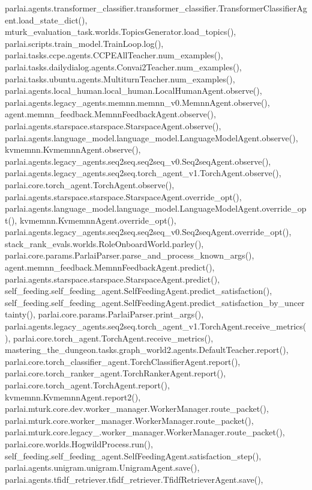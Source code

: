 parlai.\+agents.\+transformer\+\_\+classifier.\+transformer\+\_\+classifier.\+Transformer\+Classifier\+Agent.\+load\+\_\+state\+\_\+dict(), mturk\+\_\+evaluation\+\_\+task.\+worlds.\+Topics\+Generator.\+load\+\_\+topics(), parlai.\+scripts.\+train\+\_\+model.\+Train\+Loop.\+log(), parlai.\+tasks.\+ccpe.\+agents.\+C\+C\+P\+E\+All\+Teacher.\+num\+\_\+examples(), parlai.\+tasks.\+dailydialog.\+agents.\+Convai2\+Teacher.\+num\+\_\+examples(), parlai.\+tasks.\+ubuntu.\+agents.\+Multiturn\+Teacher.\+num\+\_\+examples(), parlai.\+agents.\+local\+\_\+human.\+local\+\_\+human.\+Local\+Human\+Agent.\+observe(), parlai.\+agents.\+legacy\+\_\+agents.\+memnn.\+memnn\+\_\+v0.\+Memnn\+Agent.\+observe(), agent.\+memnn\+\_\+feedback.\+Memnn\+Feedback\+Agent.\+observe(), parlai.\+agents.\+starspace.\+starspace.\+Starspace\+Agent.\+observe(), parlai.\+agents.\+language\+\_\+model.\+language\+\_\+model.\+Language\+Model\+Agent.\+observe(), kvmemnn.\+Kvmemnn\+Agent.\+observe(), parlai.\+agents.\+legacy\+\_\+agents.\+seq2seq.\+seq2seq\+\_\+v0.\+Seq2seq\+Agent.\+observe(), parlai.\+agents.\+legacy\+\_\+agents.\+seq2seq.\+torch\+\_\+agent\+\_\+v1.\+Torch\+Agent.\+observe(), parlai.\+core.\+torch\+\_\+agent.\+Torch\+Agent.\+observe(), parlai.\+agents.\+starspace.\+starspace.\+Starspace\+Agent.\+override\+\_\+opt(), parlai.\+agents.\+language\+\_\+model.\+language\+\_\+model.\+Language\+Model\+Agent.\+override\+\_\+opt(), kvmemnn.\+Kvmemnn\+Agent.\+override\+\_\+opt(), parlai.\+agents.\+legacy\+\_\+agents.\+seq2seq.\+seq2seq\+\_\+v0.\+Seq2seq\+Agent.\+override\+\_\+opt(), stack\+\_\+rank\+\_\+evals.\+worlds.\+Role\+Onboard\+World.\+parley(), parlai.\+core.\+params.\+Parlai\+Parser.\+parse\+\_\+and\+\_\+process\+\_\+known\+\_\+args(), agent.\+memnn\+\_\+feedback.\+Memnn\+Feedback\+Agent.\+predict(), parlai.\+agents.\+starspace.\+starspace.\+Starspace\+Agent.\+predict(), self\+\_\+feeding.\+self\+\_\+feeding\+\_\+agent.\+Self\+Feeding\+Agent.\+predict\+\_\+satisfaction(), self\+\_\+feeding.\+self\+\_\+feeding\+\_\+agent.\+Self\+Feeding\+Agent.\+predict\+\_\+satisfaction\+\_\+by\+\_\+uncertainty(), parlai.\+core.\+params.\+Parlai\+Parser.\+print\+\_\+args(), parlai.\+agents.\+legacy\+\_\+agents.\+seq2seq.\+torch\+\_\+agent\+\_\+v1.\+Torch\+Agent.\+receive\+\_\+metrics(), parlai.\+core.\+torch\+\_\+agent.\+Torch\+Agent.\+receive\+\_\+metrics(), mastering\+\_\+the\+\_\+dungeon.\+tasks.\+graph\+\_\+world2.\+agents.\+Default\+Teacher.\+report(), parlai.\+core.\+torch\+\_\+classifier\+\_\+agent.\+Torch\+Classifier\+Agent.\+report(), parlai.\+core.\+torch\+\_\+ranker\+\_\+agent.\+Torch\+Ranker\+Agent.\+report(), parlai.\+core.\+torch\+\_\+agent.\+Torch\+Agent.\+report(), kvmemnn.\+Kvmemnn\+Agent.\+report2(), parlai.\+mturk.\+core.\+dev.\+worker\+\_\+manager.\+Worker\+Manager.\+route\+\_\+packet(), parlai.\+mturk.\+core.\+worker\+\_\+manager.\+Worker\+Manager.\+route\+\_\+packet(), parlai.\+mturk.\+core.\+legacy\+\_.\+worker\+\_\+manager.\+Worker\+Manager.\+route\+\_\+packet(), parlai.\+core.\+worlds.\+Hogwild\+Process.\+run(), self\+\_\+feeding.\+self\+\_\+feeding\+\_\+agent.\+Self\+Feeding\+Agent.\+satisfaction\+\_\+step(), parlai.\+agents.\+unigram.\+unigram.\+Unigram\+Agent.\+save(), parlai.\+agents.\+tfidf\+\_\+retriever.\+tfidf\+\_\+retriever.\+Tfidf\+Retriever\+Agent.\+save(), 